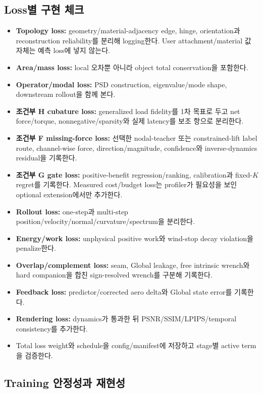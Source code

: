 \documentclass[10pt,a4paper]{article}
\newcommand{\todo}{\textcolor{TodoGray}{\(\square\)}}
\begin{document}
\subsection{Loss별 구현 체크}

\begin{itemize}
  \item[\todo] \textbf{Topology loss:} geometry/material-adjacency edge, hinge, orientation과 reconstruction reliability를 분리해 logging한다. User attachment/material 값 자체는 예측 loss에 넣지 않는다.
  \item[\todo] \textbf{Area/mass loss:} local 오차뿐 아니라 object total conservation을 포함한다.
  \item[\todo] \textbf{Operator/modal loss:} PSD construction, eigenvalue/mode shape, downstream rollout을 함께 본다.
  \item[\todo] \textbf{조건부 H cubature loss:} generalized load fidelity를 1차 목표로 두고 net force/torque, nonnegative/sparsity와 실제 latency를 보조 항으로 분리한다.
  \item[\todo] \textbf{조건부 F missing-force loss:} 선택한 nodal-teacher 또는 constrained-lift label route, channel-wise force, direction/magnitude, confidence와 inverse-dynamics residual을 기록한다.
  \item[\todo] \textbf{조건부 G gate loss:} positive-benefit regression/ranking, calibration과 fixed-\(K\) regret를 기록한다. Measured cost/budget loss는 profiler가 필요성을 보인 optional extension에서만 추가한다.
  \item[\todo] \textbf{Rollout loss:} one-step과 multi-step position/velocity/normal/curvature/spectrum을 분리한다.
  \item[\todo] \textbf{Energy/work loss:} unphysical positive work와 wind-stop decay violation을 penalize한다.
  \item[\todo] \textbf{Overlap/complement loss:} seam, Global leakage,
  free intrinsic wrench와 hard companion을 합친 sign-resolved wrench를 구분해 기록한다.
  \item[\todo] \textbf{Feedback loss:} predictor/corrected aero delta와 Global state error를 기록한다.
  \item[\todo] \textbf{Rendering loss:} dynamics가 통과한 뒤 PSNR/SSIM/LPIPS/temporal consistency를 추가한다.
  \item[\todo] Total loss weight와 schedule을 config/manifest에 저장하고 stage별 active term을 검증한다.
\end{itemize}

\subsection{Training 안정성과 재현성}
\end{document}
